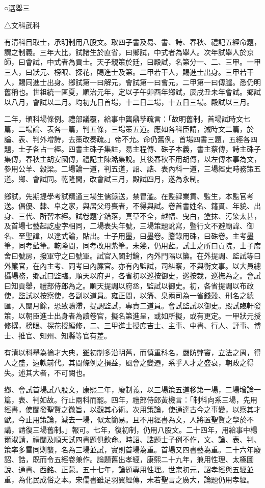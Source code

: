 
\begin{pinyinscope}
○選舉三

△文科武科

有清科目取士，承明制用八股文。取四子書及易、書、詩、春秋、禮記五經命題，謂之制義。三年大比，試諸生於直省，曰鄉試，中式者為舉人。次年試舉人於京師，曰會試，中式者為貢士。天子親策於廷，曰殿試，名第分一、二、三甲。一甲三人，曰狀元、榜眼、探花，賜進士及第。二甲若干人，賜進士出身。三甲若干人，賜同進士出身。鄉試第一曰解元，會試第一曰會元，二甲第一曰傳臚。悉仍明舊稱也。世祖統一區夏，順治元年，定以子午卯酉年鄉試，辰戌丑未年會試。鄉試以八月，會試以二月。均初九日首場，十二日二場，十五日三場。殿試以三月。

二年，頒科場條例。禮部議覆，給事中龔鼎孳疏言：「故明舊制，首場試時文七篇，二場論、表各一篇，判五條，三場策五道。應如各科臣請，減時文二篇，於論、表、判外增詩，去策改奏疏。」帝不允。命仍舊例。首場四書三題，五經各四題，士子各占一經。四書主硃子集註，易主程傳、硃子本義，書主蔡傳，詩主硃子集傳，春秋主胡安國傳，禮記主陳澔集說。其後春秋不用胡傳，以左傳本事為文，參用公羊、穀梁。二場論一道，判五道，詔、誥、表內科一道，三場經史時務策五道。鄉、會試同。乾隆間，改會試三月，殿試四月，遂為永制。

鄉試，先期提學考試精通三場生儒錄送，禁冒濫。在監肄業貢、監生，本監官考送。倡優、隸、皁之家，與居父母喪者，不得與試。卷首書姓名、籍貫、年貌、出身、三代、所習本經。試卷題字錯落，真草不全，越幅、曳白，塗抹、污染太甚，及首場七藝起訖虛字相同，二場表失年號，三場策題訛寫，暨行文不避廟諱、御名、至聖諱，以違式論，貼出。士子用墨，曰墨卷。謄錄用硃，曰硃卷。主考墨筆，同考藍筆。乾隆間，同考改用紫筆。未幾，仍用藍。試士之所曰貢院，士子席舍曰號房，撥軍守之曰號軍。試官入闈封鑰，內外門隔以簾。在外提調、監試等曰外簾官，在內主考、同考曰內簾官。亦有內監試，司糾察，不與衡文事。以大員總攝場務，鄉試曰監臨。順天以府尹，各省初以巡按御史，巡按裁，巡撫為之。會試曰知貢舉，禮部侍郎為之。順天提調以府丞，監試以御史。初，各省提調以布政使，監試以按察使，各副以道員。雍正間，以籓、臬兩司為一省錢穀、刑名之總匯，入闈月餘，恐致曠滯，提調監試，專責二道員。會試監試以御史。殿試臨軒發策，以朝臣進士出身者為讀卷官，擬名第進呈，或如所擬，或有更定。一甲狀元授修撰，榜眼、探花授編修，二、三甲進士授庶吉士、主事、中書、行人、評事、博士、推官、知州、知縣等官有差。

有清以科舉為掄才大典，雖初制多沿明舊，而慎重科名，嚴防弊竇，立法之周，得人之盛，遠軼前代。其間條例之損益，風會之變遷，系乎人才之盛衰，朝政之得失。述其大者，不可闕也。

鄉、會試首場試八股文，康熙二年，廢制義，以三場策五道移第一場，二場增論一篇，表、判如故。行止兩科而罷。四年，禮部侍郎黃機言：「制科向系三場，先用經書，使闡發聖賢之微旨，以觀其心術。次用策論，使通達古今之事變，以察其才猷。今止用策論，減去一場，似太簡易。且不用經書為文，人將置聖賢之學於不講，請復三場舊制。」報可。七年，復初制，仍用八股文。二十四年，用給事中楊爾淑請，禮闈及順天試四書題俱欽命。時詔、誥題士子例不作，文、論、表、判、策率多雷同剿襲，名為三場並試，實則首場為重。首場又四書藝為重。二十六年廢詔、誥，既而令五經卷兼作。論題舊出孝經，康熙二十九年，兼用性理、太極圖說、通書、西銘、正蒙。五十七年，論題專用性理。世宗初元，詔孝經與五經並重，為化民成俗之本。宋儒書雖足羽翼經傳，未若聖言之廣大，論題仍用孝經。


\end{pinyinscope}

